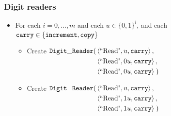     \subsubsection{ Digit readers }
        \begin{itemize}
            \item For each $i = 0,\ldots,m$ and each $u \in \{0, 1\}^i$, and
                  each ${\tt carry} \in \{{\tt increment}, {\tt copy} \}$

                \begin{itemize}
                \item Create
                    $\begin{aligned}[t]
                        {\tt Digit\_Reader}(& \left\langle \text{``Read"}, u, {\tt carry} \right\rangle, \\
                                 & \left\langle \text{``Read"}, 0u, {\tt carry} \right\rangle, \\
                                 & \left\langle \text{``Read"}, 0u, {\tt carry} \right\rangle \;)
                    \end{aligned}$

                \item Create
                $\begin{aligned}[t]
                    {\tt Digit\_Reader}(& \left\langle \text{``Read"}, u,  {\tt carry} \right\rangle, \\
                             & \left\langle \text{``Read"}, 1u, {\tt carry} \right\rangle, \\
                             & \left\langle \text{``Read"}, 1u, {\tt carry} \right\rangle \;)
                \end{aligned}$
                \end{itemize}
            \vspace{.5cm}


        \end{itemize}

